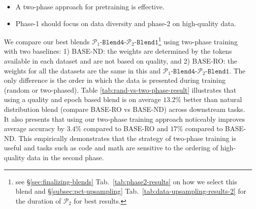 \documentclass[11pt]{article}
\newcommand{\mostofa}[1]{{\color{blue}\bf [MP: #1]}\xspace}
\newcommand{\ccderiv}{$\mathtt{CC_{dv}}$\xspace}
\newcommand{\phaseone}{$\mathcal{P}_1$\xspace}
\newcommand{\phasetwo}{$\mathcal{P}_2$\xspace}
\newcommand{\gainRO}{$3.4$\%\xspace}
\newcommand{\gainND}{$17$\%\xspace}
\newcommand{\gainROND}{$13.2$\%\xspace}
\newcommand{\ponebfourptwobone}{\phaseone-$\mathtt{Blend4}$-\phasetwo-$\mathtt{Blend1}$\xspace}
\begin{document}
\begin{tcolorbox}[colframe=black!80, colback=gray!10, coltitle=white, title=Findings, fonttitle=\bfseries]
\begin{itemize}
    \item A two-phase approach for pretraining is effective.
    \item Phase-1 should focus on data diversity and phase-2 on high-quality data.
\end{itemize}
\end{tcolorbox}




We compare our best blends \ponebfourptwobone \footnote{see \S\ref{sec:finalizing-blends} Tab.~\ref{tab:phase2-results} on how we select this blend and \S\ref{subsec:pct-upsampling} Tab.~\ref{tab:data-upsampling-results-2} for the duration of \phasetwo for best results.} using two-phase training with two baselines: 1) BASE-ND: the weights are determined by the tokens available in each dataset and are not based on quality, and 2) BASE-RO: the weights for all the datasets are the same in this and \ponebfourptwobone.
The only difference is the order in which the data is presented during training (random or two-phased).
Table \ref{tab:rand-vs-two-phase-result} illustrates that using a quality and epoch based blend is on average \gainROND better than natural distribution blend (compare BASE-RO vs BASE-ND) across downstream tasks.
It also presents that using our two-phase training approach noticeably improves average accuracy by \gainRO compared to BASE-RO and \gainND compared to BASE-ND.
This empirically demonstrates that the strategy of two-phase training is useful and tasks such as code and math are sensitive to the ordering of high-quality data in the second phase. 
\end{document}
